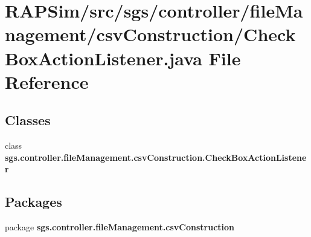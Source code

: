 \section{R\-A\-P\-Sim/src/sgs/controller/file\-Management/csv\-Construction/\-Check\-Box\-Action\-Listener.java File Reference}
\label{_check_box_action_listener_8java}
\subsection*{Classes}
\begin{DoxyCompactItemize}
\item 
class {\bf sgs.\-controller.\-file\-Management.\-csv\-Construction.\-Check\-Box\-Action\-Listener}
\end{DoxyCompactItemize}
\subsection*{Packages}
\begin{DoxyCompactItemize}
\item 
package {\bf sgs.\-controller.\-file\-Management.\-csv\-Construction}
\end{DoxyCompactItemize}
